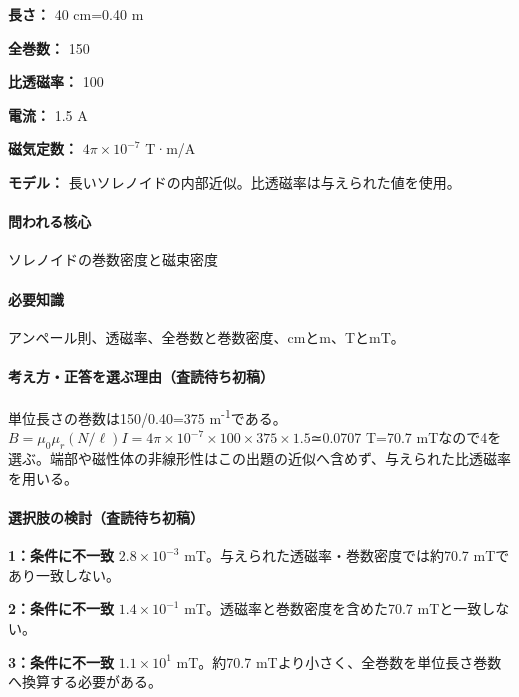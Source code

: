 \noindent\textbf{長さ：} 40 cm=\allowbreak{}0.40 m\par

\noindent\textbf{全巻数：} 150\par

\noindent\textbf{比透磁率：} 100\par

\noindent\textbf{電流：} 1.5 A\par

\noindent\textbf{磁気定数：} \(4\pi\times10^{-7}\) T·m/A\par

\noindent\textbf{モデル：} 長いソレノイドの内部近似。比透磁率は与えられた値を使用。\par

\paragraph{問われる核心} ソレノイドの巻数密度と磁束密度

\paragraph{必要知識} アンペール則、透磁率、全巻数と巻数密度、cmとm、TとmT。

\paragraph{考え方・正答を選ぶ理由（査読待ち初稿）} 単位長さの巻数は150/0.40=\allowbreak{}375 m\textsuperscript{-1}である。\(B=\mu_0\mu_r(N/\ell)I=4\pi\times10^{-7}\times100\times375\times1.5\)≃0.0707 T=\allowbreak{}70.7 mTなので4を選ぶ。端部や磁性体の非線形性はこの出題の近似へ含めず、与えられた比透磁率を用いる。

\paragraph{選択肢の検討（査読待ち初稿）}\mbox{}\par

\noindent\textbf{1：条件に不一致} \(2.8\times10^{-3}\) mT。与えられた透磁率・巻数密度では約70.7 mTであり一致しない。\par

\noindent\textbf{2：条件に不一致} \(1.4\times10^{-1}\) mT。透磁率と巻数密度を含めた70.7 mTと一致しない。\par

\noindent\textbf{3：条件に不一致} \(1.1\times10^1\) mT。約70.7 mTより小さく、全巻数を単位長さ巻数へ換算する必要がある。\par

